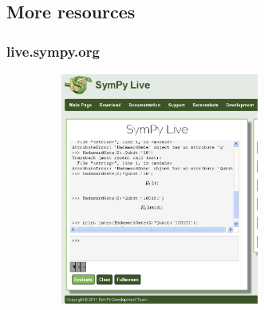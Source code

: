 \documentclass[dvips]{beamer}
\begin{document}
\subsection{ More resources }
\begin{frame}
\frametitle{live.sympy.org}
\includegraphics[height=3in,width=4in]{ex6.ps}
\end{frame}
\end{document}
